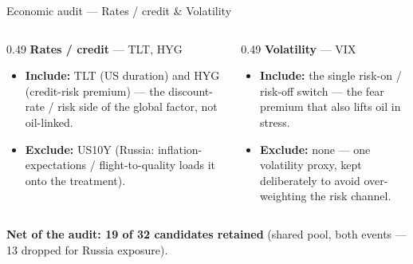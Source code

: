 \documentclass[aspectratio=169,11pt]{beamer}
\newcommand{\smalltext}[1]{{\footnotesize\textcolor{muted}{#1}}}
\newcommand{\hd}[1]{\textbf{#1}}
\begin{document}
\begin{frame}{Economic audit --- Rates / credit \& Volatility}
  \footnotesize
  \begin{columns}[T]
    \begin{column}{0.49\textwidth}
      \hd{Rates / credit} \smalltext{--- TLT, HYG}
      \begin{itemize}\setlength\itemsep{0.4em}
        \item \hd{Include:} TLT (US duration) and HYG (credit-risk premium) --- the discount-rate / risk side
          of the global factor, not oil-linked.
        \item \hd{Exclude:} US10Y (Russia: inflation-expectations / flight-to-quality loads it onto the treatment).
      \end{itemize}
    \end{column}
    \begin{column}{0.49\textwidth}
      \hd{Volatility} \smalltext{--- VIX}
      \begin{itemize}\setlength\itemsep{0.4em}
        \item \hd{Include:} the single risk-on / risk-off switch --- the fear premium that also lifts oil in stress.
        \item \hd{Exclude:} none --- one volatility proxy, kept deliberately to avoid over-weighting the
          risk channel.
      \end{itemize}
    \end{column}
  \end{columns}

  \vspace{1em}
  \begin{center}
    {\normalsize \hd{Net of the audit: 19 of 32 candidates retained}}
    \smalltext{(shared pool, both events --- 13 dropped for Russia exposure).}
  \end{center}
\end{frame}
\end{document}
